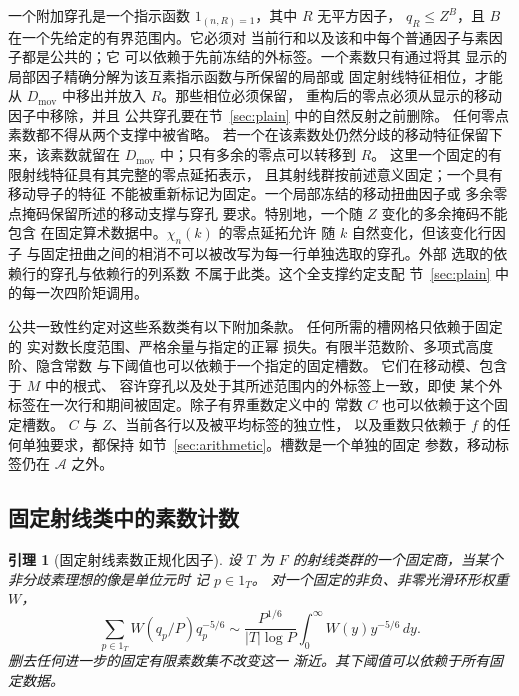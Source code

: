 \documentclass[11pt,a4paper]{article}
\numberwithin{equation}{section}
\numberwithin{figure}{section}
\newtheorem{lemma}[theorem]{引理}
\theoremstyle{definition}
\theoremstyle{remark}
\begin{document}
一个附加穿孔是一个指示函数 $1_{(n,R)=1}$，其中 $R$ 无平方因子，
$q_R\le Z^B$，且 $B$ 在一个先给定的有界范围内。它必须对
当前行和以及该和中每个普通因子与素因子都是公共的；它
可以依赖于先前冻结的外标签。一个素数只有通过将其
显示的局部因子精确分解为该互素指示函数与所保留的局部或
固定射线特征相位，才能从 $D_{\mathrm{mov}}$ 中移出并放入 $R$。那些相位必须保留，
重构后的零点必须从显示的移动因子中移除，并且
公共穿孔要在节~\ref{sec:plain} 中的自然反射之前删除。
任何零点素数都不得从两个支撑中被省略。
若一个在该素数处仍然分歧的移动特征保留下来，该素数就留在
$D_{\mathrm{mov}}$ 中；只有多余的零点可以转移到 $R$。
这里一个固定的有限射线特征具有其完整的零点延拓表示，
且其射线群按前述意义固定；一个具有移动导子的特征
不能被重新标记为固定。一个局部冻结的移动扭曲因子或
多余零点掩码保留所述的移动支撑与穿孔
要求。特别地，一个随 $Z$ 变化的多余掩码不能包含
在固定算术数据中。$\chi_n(k)$ 的零点延拓允许
随 $k$ 自然变化，但该变化行因子
与固定扭曲之间的相消不可以被改写为每一行单独选取的穿孔。外部
选取的依赖行的穿孔与依赖行的列系数
不属于此类。这个全支撑约定支配
节~\ref{sec:plain} 中的每一次四阶矩调用。

公共一致性约定对这些系数类有以下附加条款。
任何所需的槽网格只依赖于固定的
实对数长度范围、严格余量与指定的正幂
损失。有限半范数阶、多项式高度阶、隐含常数
与下阈值也可以依赖于一个指定的固定槽数。
它们在移动模、包含于 $M$ 中的根式、
容许穿孔以及处于其所述范围内的外标签上一致，即使
某个外标签在一次行和期间被固定。除子有界重数定义中的
常数 $C$ 也可以依赖于这个固定槽数。
$C$ 与 $Z$、当前各行以及被平均标签的独立性，
以及重数只依赖于 $f$ 的任何单独要求，都保持
如节~\ref{sec:arithmetic}。槽数是一个单独的固定
参数，移动标签仍在 $\mathcal A$ 之外。

\subsection{固定射线类中的素数计数}

\begin{lemma}[固定射线素数正规化因子]\label{lem:ray-prime-normalizer}
设 $T$ 为 $F$ 的射线类群的一个固定商，当某个非分歧素理想的像是单位元时
记 $p\in1_T$。
对一个固定的非负、非零光滑环形权重 $W$，
\begin{equation}\label{eq:ray-prime-normalizer}
 \sum_{p\in1_T}W(q_p/P)q_p^{-5/6}
 \sim\frac{P^{1/6}}{|T|\log P}
      \int_0^\infty W(y)y^{-5/6}\,dy.
\end{equation}
删去任何进一步的固定有限素数集不改变这一
渐近。其下阈值可以依赖于所有固定数据。
\end{lemma}
\end{document}
